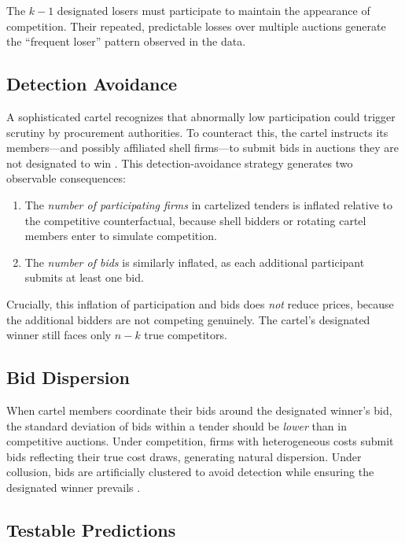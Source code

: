 The $k - 1$ designated losers must participate to maintain the appearance of competition. Their repeated, predictable losses over multiple auctions generate the ``frequent loser'' pattern observed in the data.

\subsection{Detection Avoidance}

A sophisticated cartel recognizes that abnormally low participation could trigger scrutiny by procurement authorities. To counteract this, the cartel instructs its members---and possibly affiliated shell firms---to submit bids in auctions they are not designated to win \citep{chassang2022robust}. This detection-avoidance strategy generates two observable consequences:

\begin{enumerate}
  \item The \emph{number of participating firms} in cartelized tenders is inflated relative to the competitive counterfactual, because shell bidders or rotating cartel members enter to simulate competition.
  \item The \emph{number of bids} is similarly inflated, as each additional participant submits at least one bid.
\end{enumerate}

Crucially, this inflation of participation and bids does \emph{not} reduce prices, because the additional bidders are not competing genuinely. The cartel's designated winner still faces only $n - k$ true competitors.

\subsection{Bid Dispersion}

When cartel members coordinate their bids around the designated winner's bid, the standard deviation of bids within a tender should be \emph{lower} than in competitive auctions. Under competition, firms with heterogeneous costs submit bids reflecting their true cost draws, generating natural dispersion. Under collusion, bids are artificially clustered to avoid detection while ensuring the designated winner prevails \citep{athey2011comparing}.

\subsection{Testable Predictions}

